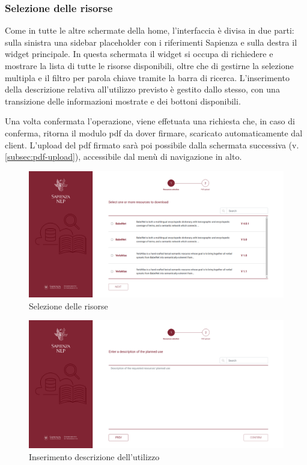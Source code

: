 \subsubsection{Selezione delle risorse} \label{subsec:resources-selection}
Come in tutte le altre schermate della home, l'interfaccia è divisa in due parti:
sulla sinistra una sidebar placeholder con i riferimenti Sapienza e sulla
destra il widget principale. In questa schermata il widget si occupa di richiedere
e mostrare la lista di tutte le risorse disponibili, oltre che di gestirne la
selezione multipla e il filtro per parola chiave tramite la barra di ricerca.
L'inserimento della descrizione relativa all'utilizzo previsto è gestito dallo
stesso, con una transizione delle informazioni mostrate e dei bottoni disponibili.

Una volta confermata l'operazione, viene effetuata una richiesta che, in caso di
conferma, ritorna il modulo pdf da dover firmare, scaricato automaticamente dal
client. L'upload del pdf firmato sarà poi possibile dalla schermata successiva
(v. \autoref{subsec:pdf-upload}), accessibile dal menù di navigazione in alto.

\begin{figure}[H]
	\centering
	\includegraphics[width=\textwidth]{assets/ui/resources-selection.png}
	\caption{Selezione delle risorse}
	\label{fig:resources-selection}
\end{figure}

\begin{figure}[H]
	\centering
	\includegraphics[width=\textwidth]{assets/ui/request-description.png}
	\caption{Inserimento descrizione dell'utilizzo}
	\label{fig:request-description}
\end{figure}

